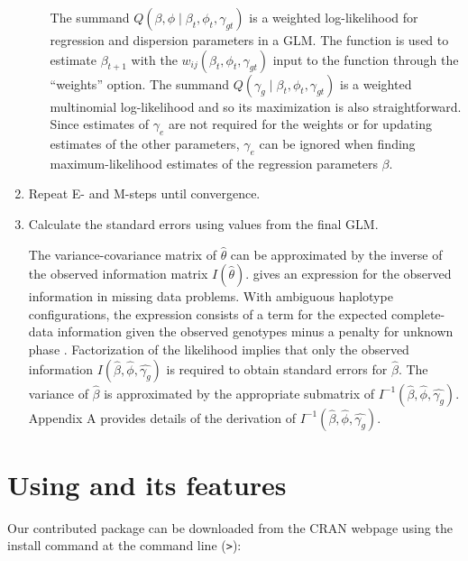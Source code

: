 \documentclass[article, shortnames]{jss}
\begin{document}
\begin{enumerate}
\begin{enumerate}
The summand $Q(\beta , \phi\mid \beta_t, \phi_t, \gamma_{gt})$ is a
weighted log-likelihood for regression and dispersion parameters in a
GLM. The   function is used to estimate 
 $\beta_{t+1}$ with the $w_{ij}(\beta_t,\phi_t,\gamma_{gt})$
input to the  function through the ``weights'' option. 
The summand $Q(\gamma_g \mid \beta_t, \phi_t, \gamma_{gt})$ is a weighted 
multinomial log-likelihood and so its maximization is also straightforward.
Since estimates of $\gamma_e$ are not
required for the weights or for updating estimates of the other
parameters, $\gamma_e$ can be ignored when finding maximum-likelihood
estimates of the regression parameters $\beta$.

\end{enumerate}

\item Repeat E- and M-steps until convergence. 

\item Calculate the standard errors using values from the final GLM.

The variance-covariance matrix of $\widehat{\theta}$ can be approximated
by the inverse of the observed information matrix $I(\widehat{\theta})$.
\citet{Louis82} gives an expression for the observed information in
missing data problems. With ambiguous haplotype configurations, the expression 
consists of a term for the expected complete-data information given the observed
genotypes minus a penalty for unknown phase \citep{Schaid02}.
Factorization of the likelihood implies that only the observed information
$I(\widehat{\beta},\widehat{\phi},\widehat{\gamma_g})$ is required to
obtain standard errors for $\widehat{\beta}$. The variance of
$\widehat{\beta}$ is approximated by the appropriate submatrix of
$I^{-1}(\widehat{\beta},\widehat{\phi},\widehat{\gamma_g})$. Appendix A
provides details of the derivation of
$I^{-1}(\widehat{\beta},\widehat{\phi},\widehat{\gamma_g})$.

\end{enumerate}

\section[Using hapassoc and its features]{Using  and its features}

Our contributed  package  
can be downloaded from the CRAN webpage using the install command at the
 command line (\texttt{>}):
\end{document}
